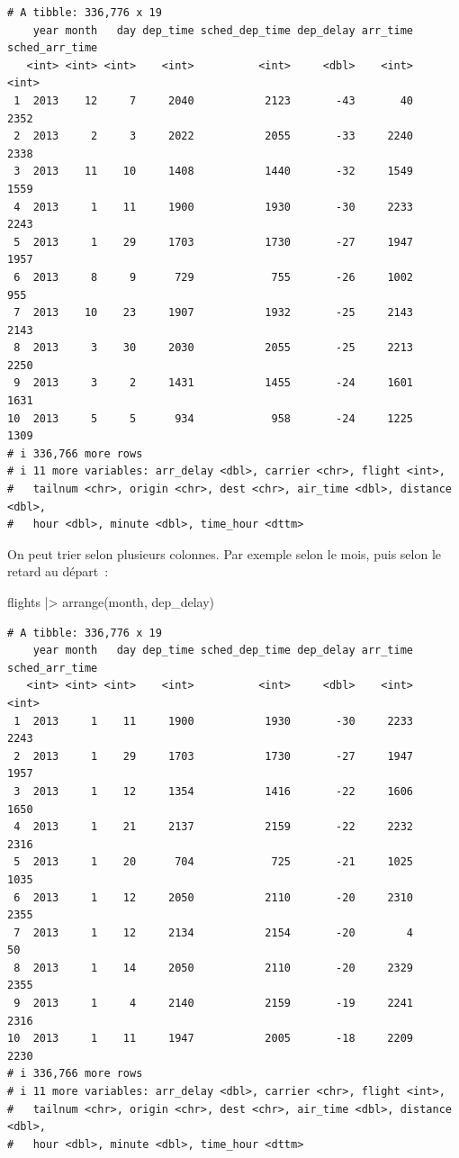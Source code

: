 \documentclass[
  letterpaper,
  DIV=11,
  numbers=noendperiod,
  oneside]{scrreprt}
\newenvironment{Shaded}{\begin{snugshade}}{\end{snugshade}}
\newcommand{\FunctionTok}[1]{\textcolor[rgb]{0.28,0.35,0.67}{#1}}
\newcommand{\NormalTok}[1]{\textcolor[rgb]{0.00,0.23,0.31}{#1}}
\newcommand{\SpecialCharTok}[1]{\textcolor[rgb]{0.37,0.37,0.37}{#1}}
\begin{document}
\begin{verbatim}
# A tibble: 336,776 x 19
    year month   day dep_time sched_dep_time dep_delay arr_time sched_arr_time
   <int> <int> <int>    <int>          <int>     <dbl>    <int>          <int>
 1  2013    12     7     2040           2123       -43       40           2352
 2  2013     2     3     2022           2055       -33     2240           2338
 3  2013    11    10     1408           1440       -32     1549           1559
 4  2013     1    11     1900           1930       -30     2233           2243
 5  2013     1    29     1703           1730       -27     1947           1957
 6  2013     8     9      729            755       -26     1002            955
 7  2013    10    23     1907           1932       -25     2143           2143
 8  2013     3    30     2030           2055       -25     2213           2250
 9  2013     3     2     1431           1455       -24     1601           1631
10  2013     5     5      934            958       -24     1225           1309
# i 336,766 more rows
# i 11 more variables: arr_delay <dbl>, carrier <chr>, flight <int>,
#   tailnum <chr>, origin <chr>, dest <chr>, air_time <dbl>, distance <dbl>,
#   hour <dbl>, minute <dbl>, time_hour <dttm>
\end{verbatim}

On peut trier selon plusieurs colonnes. Par exemple selon le mois, puis
selon le retard au départ~:

\begin{Shaded}
\begin{Highlighting}[]
\NormalTok{flights }\SpecialCharTok{|\textgreater{}} 
  \FunctionTok{arrange}\NormalTok{(month, dep\_delay)}
\end{Highlighting}
\end{Shaded}

\begin{verbatim}
# A tibble: 336,776 x 19
    year month   day dep_time sched_dep_time dep_delay arr_time sched_arr_time
   <int> <int> <int>    <int>          <int>     <dbl>    <int>          <int>
 1  2013     1    11     1900           1930       -30     2233           2243
 2  2013     1    29     1703           1730       -27     1947           1957
 3  2013     1    12     1354           1416       -22     1606           1650
 4  2013     1    21     2137           2159       -22     2232           2316
 5  2013     1    20      704            725       -21     1025           1035
 6  2013     1    12     2050           2110       -20     2310           2355
 7  2013     1    12     2134           2154       -20        4             50
 8  2013     1    14     2050           2110       -20     2329           2355
 9  2013     1     4     2140           2159       -19     2241           2316
10  2013     1    11     1947           2005       -18     2209           2230
# i 336,766 more rows
# i 11 more variables: arr_delay <dbl>, carrier <chr>, flight <int>,
#   tailnum <chr>, origin <chr>, dest <chr>, air_time <dbl>, distance <dbl>,
#   hour <dbl>, minute <dbl>, time_hour <dttm>
\end{verbatim}
\end{document}
